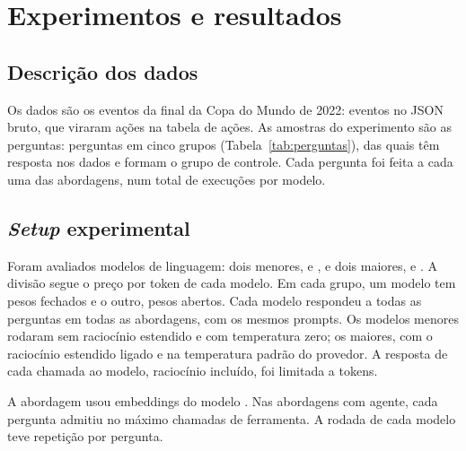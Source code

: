%

\section{Experimentos e resultados}\label{sec:experimentos}

\subsection{Descrição dos dados}

Os dados são os eventos da final da Copa do Mundo de 2022: \nEvents{} eventos no JSON bruto, que viraram
\nActions{} ações na tabela de ações. As amostras do experimento são as perguntas: \nQuestions{} perguntas em cinco
grupos (Tabela~\ref{tab:perguntas}), das quais \nAnswerable{} têm resposta nos dados e \nControl{} formam o grupo de
controle. Cada pergunta foi feita a cada uma das \nArms{} abordagens, num total de \nRuns{} execuções por modelo.

\subsection{\textit{Setup} experimental}\label{sec:setup}

Foram avaliados \nModels{} modelos de linguagem: dois menores, \modelHaiku{} e \modelQwen{}, e dois maiores,
\modelSonnet{} e \modelKimi{}. A divisão segue o preço por token de cada modelo. Em cada grupo, um modelo tem pesos fechados e o outro, pesos abertos. Cada modelo respondeu a todas as perguntas em todas as abordagens, com os
mesmos prompts. Os modelos menores rodaram sem raciocínio estendido e com temperatura zero; os maiores, com o
raciocínio estendido ligado e na temperatura padrão do provedor. A resposta de cada chamada ao modelo, raciocínio incluído, foi limitada a \nMaxOutTokens{} tokens.

A abordagem \armVector{} usou embeddings do modelo \texttt{\embedModel}. Nas abordagens com agente, cada pergunta
admitiu no máximo \nMaxCalls{} chamadas de ferramenta. A rodada de cada modelo teve \nRepeats{} repetição por
pergunta.

